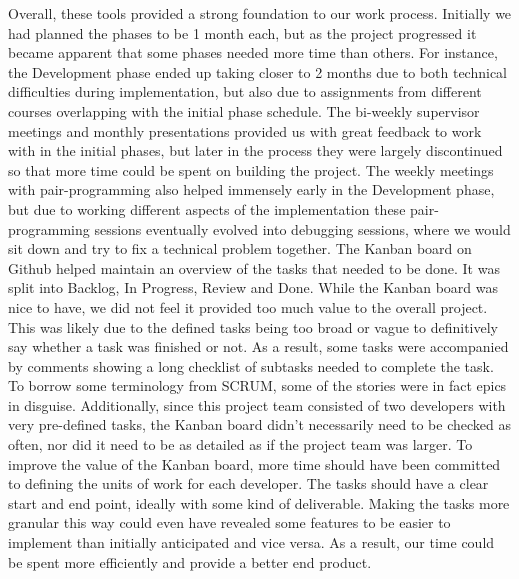 Overall, these tools provided a strong foundation to our work process. Initially we had planned the phases to be 1 month
each, but as the project progressed it became apparent that some phases needed more time than others. For instance, the
Development phase ended up taking closer to 2 months due to both technical difficulties during implementation, but also
due to assignments from different courses overlapping with the initial phase schedule.
The bi-weekly supervisor meetings and monthly presentations provided us with great feedback to work with in the initial
phases, but later in the process they were largely discontinued so that more time could be spent on building the project.
The weekly meetings with pair-programming also helped immensely early in the Development phase, but due to working different
aspects of the implementation these pair-programming sessions eventually evolved into debugging sessions, where we would
sit down and try to fix a technical problem together.
The Kanban board on Github helped maintain an overview of the tasks that needed to be done. It was split into Backlog, In Progress,
Review and Done. While the Kanban board was nice to have, we did not feel it provided too much value to the overall project.
This was likely due to the defined tasks being too broad or vague to definitively say whether a task was finished or not.
As a result, some tasks were accompanied by comments showing a long checklist of subtasks needed to complete the task. 
To borrow some terminology from SCRUM, some of the stories were in fact epics in disguise. Additionally, since this project
team consisted of two developers with very pre-defined tasks, the Kanban board didn't necessarily need to be checked as 
often, nor did it need to be as detailed as if the project team was larger.
To improve the value of the Kanban board, more time should have been committed to defining the units of work for each
developer. The tasks should have a clear start and end point, ideally with some kind of deliverable. Making the tasks more
granular this way could even have revealed some features to be easier to implement than initially anticipated and vice versa.
As a result, our time could be spent more efficiently and provide a better end product.
